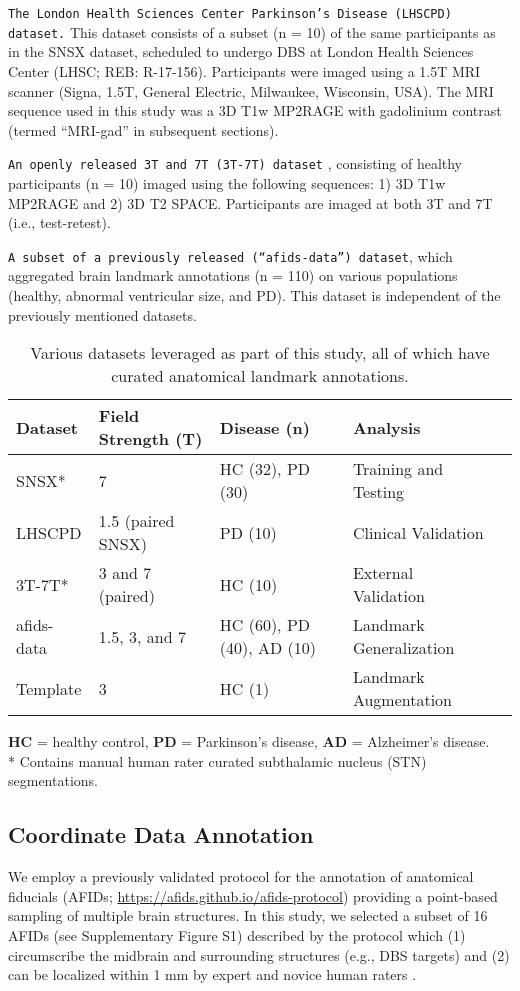 \texttt{The London Health Sciences Center Parkinson’s Disease (LHSCPD) dataset.} This dataset consists of a subset (n = 10) of the same participants as in the SNSX dataset, scheduled to undergo DBS at London Health Sciences Center (LHSC; REB: R-17-156). Participants were imaged using a 1.5T MRI scanner (Signa, 1.5T, General Electric, Milwaukee, Wisconsin, USA). The MRI sequence used in this study was a 3D T1w MP2RAGE with gadolinium contrast (termed “MRI-gad” in subsequent sections).

\texttt{An openly released 3T and 7T (3T-7T) dataset} \cite{Chen2023-cn}, consisting of healthy participants (n = 10) imaged using the following sequences: 1) 3D T1w MP2RAGE and 2) 3D T2 SPACE. Participants are imaged at both 3T and 7T (i.e., test-retest).

\texttt{A subset of a previously released (“afids-data”) dataset}, which aggregated brain landmark annotations (n = 110) on various populations (healthy, abnormal ventricular size, and PD). This dataset is independent of the previously mentioned datasets.

\begin{table}[h!]
\centering
\caption{Various datasets leveraged as part of this study, all of which have curated anatomical landmark annotations.}
\begin{tabularx}{\textwidth}{l l l l l}
\toprule
\textbf{Dataset} & \textbf{Field Strength (T)} & \textbf{Disease (n)} & \textbf{Analysis} \\
\midrule
SNSX* & 7 & HC (32), PD (30) & Training and Testing  \\
LHSCPD & 1.5 (paired SNSX) & PD (10) & Clinical Validation \\
3T-7T* & 3 and 7 (paired) & HC (10) & External Validation  \\
afids-data & 1.5, 3, and 7 & HC (60), PD (40), AD (10) & Landmark Generalization \\
Template & 3 & HC (1) & Landmark Augmentation  \\
\bottomrule
\end{tabularx}

\vspace{1ex}
\raggedright
\footnotesize{
\textbf{HC} = healthy control, \textbf{PD} = Parkinson’s disease, \textbf{AD} = Alzheimer’s disease.\\
* Contains manual human rater curated subthalamic nucleus (STN) segmentations.
}
\label{tab:afidpred_datasets}
\end{table}

\subsection{Coordinate Data Annotation}
We employ a previously validated protocol for the annotation of anatomical fiducials (AFIDs; \url{https://afids.github.io/afids-protocol}) providing a point-based sampling of multiple brain structures. In this study, we selected a subset of 16 AFIDs (see Supplementary Figure S1) described by the protocol which (1) circumscribe the midbrain and surrounding structures (e.g., DBS targets) and (2) can be localized within 1 mm by expert and novice human raters \cite{ref}.

